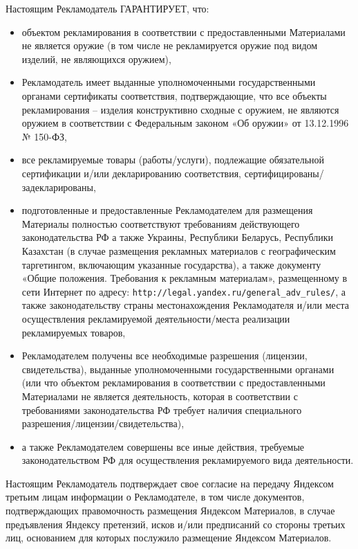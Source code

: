 \noindent
    Настоящим Рекламодатель ГАРАНТИРУЕТ, что:
\begin{itemize}
    \item объектом рекламирования в соответствии с предоставленными Материалами не является оружие (в том числе не рекламируется оружие под видом изделий, не являющихся оружием),
    \item Рекламодатель имеет выданные уполномоченными государственными органами сертификаты соответствия, подтверждающие, что все объекты рекламирования – изделия конструктивно сходные с оружием, не являются оружием в соответствии с Федеральным законом «Об оружии» от 13.12.1996 № 150-ФЗ,
    \item все рекламируемые товары (работы/услуги), подлежащие обязательной сертификации и/или декларированию соответствия, сертифицированы/задекларированы,
    \item подготовленные и предоставленные Рекламодателем для размещения Материалы полностью соответствуют требованиям действующего законодательства РФ а также Украины, Республики Беларусь, Республики Казахстан (в случае размещения рекламных материалов с географическим таргетингом, включающим указанные государства), а также документу «Общие положения. Требования к рекламным материалам», размещенному в сети Интернет по адресу: \lb \verb|http://legal.yandex.ru/general_adv_rules/|, а также законодательству страны местонахождения Рекламодателя и/или места осуществления рекламируемой деятельности/места реализации рекламируемых товаров,
    \item Рекламодателем получены все необходимые разрешения (лицензии, свидетельства), выданные уполномоченными государственными органами (или что объектом рекламирования в соответствии с предоставленными Материалами не является деятельность, которая в соответствии с требованиями законодательства РФ требует наличия специального разрешения/лицензии/свидетельства),
    \item а также Рекламодателем совершены все иные действия, требуемые законодательством РФ для осуществления рекламируемого вида деятельности.
\end{itemize}

\noindent
    Настоящим Рекламодатель подтверждает свое согласие на передачу Яндексом третьим лицам информации о Рекламодателе, в том числе документов, подтверждающих правомочность размещения Яндексом Материалов, в случае предъявления Яндексу претензий, исков и/или предписаний со стороны третьих лиц, основанием для которых послужило размещение Яндексом Материалов.
\vspace{0.5em}

